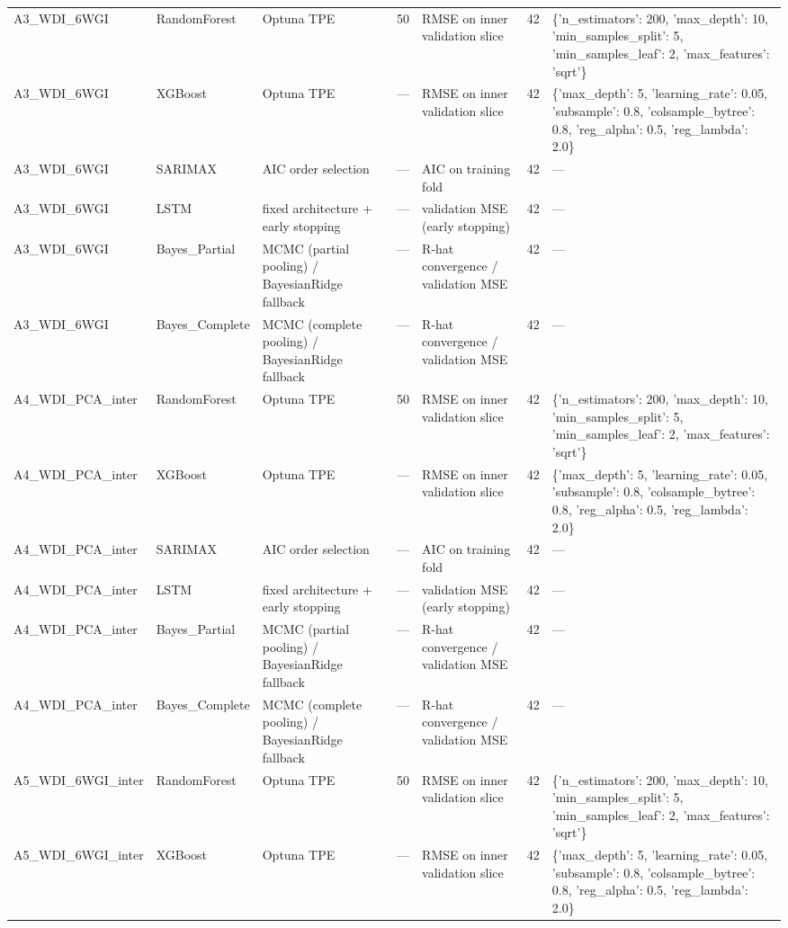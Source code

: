 \begin{table}
\begin{tabular}{lllllrl}
A3\_WDI\_6WGI & RandomForest & Optuna TPE & 50 & RMSE on inner validation slice & 42 & \{'n\_estimators': 200, 'max\_depth': 10, 'min\_samples\_split': 5, 'min\_samples\_leaf': 2, 'max\_features': 'sqrt'\} \\
A3\_WDI\_6WGI & XGBoost & Optuna TPE & — & RMSE on inner validation slice & 42 & \{'max\_depth': 5, 'learning\_rate': 0.05, 'subsample': 0.8, 'colsample\_bytree': 0.8, 'reg\_alpha': 0.5, 'reg\_lambda': 2.0\} \\
A3\_WDI\_6WGI & SARIMAX & AIC order selection & — & AIC on training fold & 42 & — \\
A3\_WDI\_6WGI & LSTM & fixed architecture + early stopping & — & validation MSE (early stopping) & 42 & — \\
A3\_WDI\_6WGI & Bayes\_Partial & MCMC (partial pooling) / BayesianRidge fallback & — & R-hat convergence / validation MSE & 42 & — \\
A3\_WDI\_6WGI & Bayes\_Complete & MCMC (complete pooling) / BayesianRidge fallback & — & R-hat convergence / validation MSE & 42 & — \\
A4\_WDI\_PCA\_inter & RandomForest & Optuna TPE & 50 & RMSE on inner validation slice & 42 & \{'n\_estimators': 200, 'max\_depth': 10, 'min\_samples\_split': 5, 'min\_samples\_leaf': 2, 'max\_features': 'sqrt'\} \\
A4\_WDI\_PCA\_inter & XGBoost & Optuna TPE & — & RMSE on inner validation slice & 42 & \{'max\_depth': 5, 'learning\_rate': 0.05, 'subsample': 0.8, 'colsample\_bytree': 0.8, 'reg\_alpha': 0.5, 'reg\_lambda': 2.0\} \\
A4\_WDI\_PCA\_inter & SARIMAX & AIC order selection & — & AIC on training fold & 42 & — \\
A4\_WDI\_PCA\_inter & LSTM & fixed architecture + early stopping & — & validation MSE (early stopping) & 42 & — \\
A4\_WDI\_PCA\_inter & Bayes\_Partial & MCMC (partial pooling) / BayesianRidge fallback & — & R-hat convergence / validation MSE & 42 & — \\
A4\_WDI\_PCA\_inter & Bayes\_Complete & MCMC (complete pooling) / BayesianRidge fallback & — & R-hat convergence / validation MSE & 42 & — \\
A5\_WDI\_6WGI\_inter & RandomForest & Optuna TPE & 50 & RMSE on inner validation slice & 42 & \{'n\_estimators': 200, 'max\_depth': 10, 'min\_samples\_split': 5, 'min\_samples\_leaf': 2, 'max\_features': 'sqrt'\} \\
A5\_WDI\_6WGI\_inter & XGBoost & Optuna TPE & — & RMSE on inner validation slice & 42 & \{'max\_depth': 5, 'learning\_rate': 0.05, 'subsample': 0.8, 'colsample\_bytree': 0.8, 'reg\_alpha': 0.5, 'reg\_lambda': 2.0\} \\

\end{tabular}
\end{table}
